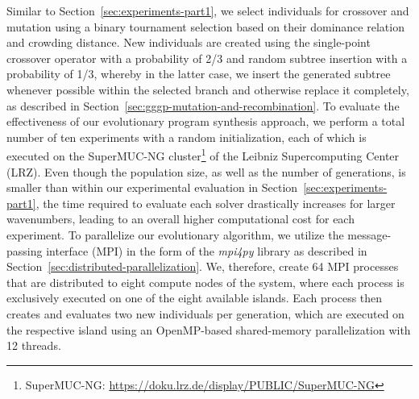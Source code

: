 Similar to Section~\ref{sec:experiments-part1}, we select individuals for crossover and mutation using a binary tournament selection based on their dominance relation and crowding distance.
New individuals are created using the single-point crossover operator with a probability of 2/3 and random subtree insertion with a probability of 1/3, whereby in the latter case, we insert the generated subtree whenever possible within the selected branch and otherwise replace it completely, as described in Section~\ref{sec:gggp-mutation-and-recombination}.
To evaluate the effectiveness of our evolutionary program synthesis approach, we perform a total number of ten experiments with a random initialization, each of which is executed on the SuperMUC-NG cluster\footnote{SuperMUC-NG: \url{https://doku.lrz.de/display/PUBLIC/SuperMUC-NG}} of the Leibniz Supercomputing Center (LRZ).
Even though the population size, as well as the number of generations, is smaller than within our experimental evaluation in Section~\ref{sec:experiments-part1}, the time required to evaluate each solver drastically increases for larger wavenumbers, leading to an overall higher computational cost for each experiment.
To parallelize our evolutionary algorithm, we utilize the message-passing interface (MPI) in the form of the \emph{mpi4py} library as described in Section~\ref{sec:distributed-parallelization}. 
We, therefore, create 64 MPI processes that are distributed to eight compute nodes of the system, where each process is exclusively executed on one of the eight available islands.
Each process then creates and evaluates two new individuals per generation, which are executed on the respective island using an OpenMP-based shared-memory parallelization with 12 threads.

